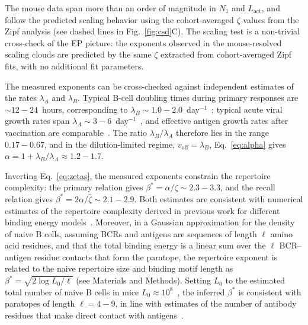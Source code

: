 \documentclass[aps, pre, twocolumn, 10pt, groupedaddress, superscriptaddress, linenumbers]{revtex4-2}
\newcommand{\off}{\text{off}}
\newcommand{\act}{\text{act}}
\newcommand{\lam}{\lambda}
\begin{document}
The mouse data span more than an order of magnitude in $N_1$ and $L_\act$, and follow the predicted scaling behavior using the cohort-averaged $\zeta$ values from the Zipf analysis (see dashed lines in Fig.~\ref{fig:csd}C).
The scaling test is a non-trivial cross-check of the EP picture: the exponents observed in the mouse-resolved scaling clouds are predicted by the same $\zeta$ extracted from cohort-averaged Zipf fits, with no additional fit parameters.

The measured exponents can be cross-checked against independent estimates of the rates $\lam_A$ and $\lam_B$.
Typical B-cell doubling times during primary responses are $\sim 12-24$~hours, corresponding to $\lam_B \sim 1.0-2.0$~day$^{-1}$~\cite{pape_different_2011, mesin_germinal_2016, Victora_2022_GC, gitlin_clonal_2014}; typical acute viral growth rates span $\lam_A \sim 3-6$~day$^{-1}$~\cite{perelson_hiv-1_1996, baccam_kinetics_2006}, and effective antigen growth rates after vaccination are comparable~\cite{MoranTovar_2024_Primary}.
The ratio $\lam_B/\lam_A$ therefore lies in the range $0.17-0.67$, and in the dilution-limited regime, $v_\off = \lam_B$, Eq.~\ref{eq:alpha} gives $\alpha = 1 + \lam_B/\lam_A \approx 1.2-1.7$.

Inverting Eq.~\ref{eq:zetas}, the measured exponents constrain the repertoire complexity: the primary relation gives $\beta^* = \alpha/\zeta \sim 2.3-3.3$, and the recall relation gives $\beta^* = 2\alpha/\hat\zeta \sim 2.1-2.9$.
Both estimates are consistent with numerical estimates of the repertoire complexity derived in previous work for different binding energy models~\cite{MoranTovar_2024_Primary}.
Moreover, in a Gaussian approximation for the density of naive B cells, assuming BCRs and antigens are sequences of length $\ell$ amino acid residues, and that the total binding energy is a linear sum over the $\ell$ BCR–antigen residue contacts that form the paratope, the repertoire exponent is related to the naive repertoire size and binding motif length as $\beta^* = \sqrt{2\log{L_0}/\ell}$ (see Materials and Methods).
Setting $L_0$ to the estimated total number of naive B cells in mice $L_0 \approx 10^8$~\cite{AltanBonnet_2020_Review}, the inferred $\beta^*$ is consistent with paratopes of length $\ell = 4-9$, in line with estimates of the number of antibody residues that make direct contact with antigens~\cite{akbarCompactVocabularyParatopeepitope2021}.
\end{document}
